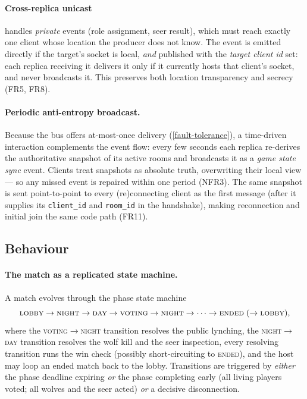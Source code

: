 \documentclass{scrartcl}
\begin{document}
\paragraph{Cross-replica unicast} handles \emph{private} events (role
assignment, seer result), which must reach exactly one client whose location the
producer does not know. The event is emitted directly if the target's socket is
local, \emph{and} published with the \emph{target client id} set: each replica
receiving it delivers it only if it currently hosts that client's socket, and
never broadcasts it. This preserves both location transparency and secrecy (FR5,
FR8).

\paragraph{Periodic anti-entropy broadcast.}
Because the bus offers at-most-once delivery (\cref{fault-tolerance}), a
time-driven interaction complements the event flow: every few seconds each
replica re-derives the authoritative snapshot of its active rooms and broadcasts
it as a \emph{game state sync} event. Clients treat snapshots as absolute truth,
overwriting their local view --- so any missed event is repaired within one
period (NFR3). The same snapshot is sent point-to-point to every (re)connecting
client as the first message (after it supplies its \texttt{client\_id} and
\texttt{room\_id} in the handshake), making reconnection and initial join the
same code path (FR11).

\subsection{Behaviour}\label{behaviour}

\paragraph{The match as a replicated state machine.}
A match evolves through the phase state machine
\[
      \textsc{lobby} \rightarrow \textsc{night} \rightarrow \textsc{day}
      \rightarrow \textsc{voting} \rightarrow \textsc{night} \rightarrow \cdots
      \rightarrow \textsc{ended} \; (\rightarrow \textsc{lobby}),
\]
where the \textsc{voting}$\to$\textsc{night} transition resolves the public
lynching, the \textsc{night}$\to$\textsc{day} transition resolves the wolf kill
and the seer inspection, every resolving transition runs the win check (possibly
short-circuiting to \textsc{ended}), and the host may loop an ended match back to
the lobby. Transitions are triggered by \emph{either} the phase deadline expiring
\emph{or} the phase completing early (all living players voted; all wolves and the
seer acted) \emph{or} a decisive disconnection.
\end{document}
